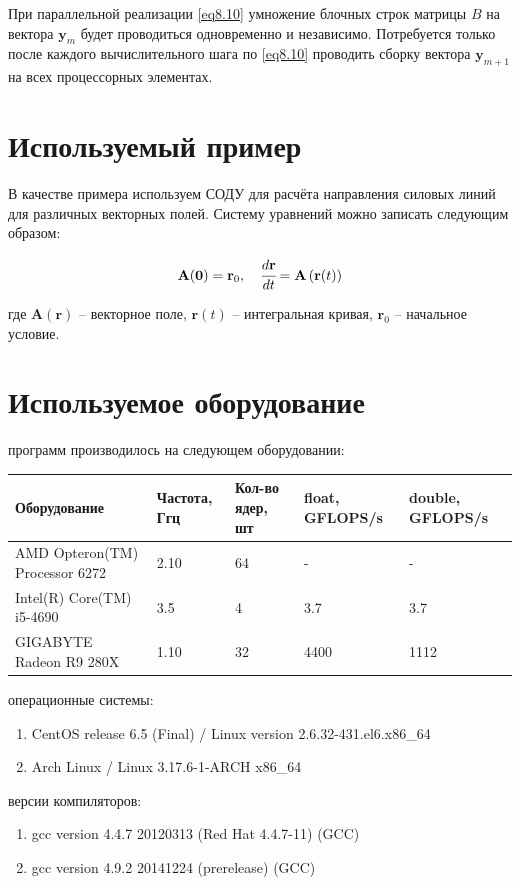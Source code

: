 \documentclass[14pt,final,titlepage,pscyr]{hedwork}
\renewcommand{\vec}[1]{\mathbf{#1}}
\begin{document}
При параллельной реализации \eqref{eq8.10} умножение блочных строк матрицы \( B \) на вектора 
\( \vec{y}_m \) будет проводиться одновременно и независимо. Потребуется только после каждого 
вычислительного шага по \eqref{eq8.10} проводить сборку вектора \( \vec{y}_{m+1} \) на всех процессорных 
элементах.\cite{methods}

\section{Используемый пример}
В качестве примера используем СОДУ для расчёта направления силовых линий для различных векторных 
полей. Систему уравнений можно записать следующим образом:

\[
	\vec{A}(\vec{0}) = \vec{r}_0, \quad \cfrac{d\vec{r}}{dt} = \vec{A}\left( \vec{r}(t) \right)
\]

где \( \vec{A}(\vec{r}) \) -- векторное поле, \( \vec{r}(t) \) -- интегральная кривая, 
\( \vec{r}_0 \) -- начальное условие.

\newpage

\section{Используемое оборудование}
 программ производилось на следующем оборудовании:
\begin{table}[h]
    \center
    \begin{tabular}{|C{5cm}|C{2cm}|C{2cm}|C{3cm}|C{3cm}|}
        \hline
        Оборудование & Частота, Ггц & Кол-во ядер, шт & float, GFLOPS/s & double, GFLOPS/s \\ \hline
        AMD Opteron(TM) Processor 6272 & 2.10 & 64 & - & - \\ \hline
        Intel(R) Core(TM) i5-4690 & 3.5 & 4 & 3.7 & 3.7 \\ \hline
        GIGABYTE Radeon R9 280X & 1.10 & 32 & 4400 & 1112 \\ \hline
    \end{tabular}
\end{table}

 операционные системы:
\begin{enumerate}
	\item CentOS release 6.5 (Final) / Linux version 2.6.32-431.el6.x86\_64
	\item Arch Linux / Linux 3.17.6-1-ARCH x86\_64
\end{enumerate}

 версии компиляторов:
\begin{enumerate}
	\item gcc version 4.4.7 20120313 (Red Hat 4.4.7-11) (GCC)
	\item gcc version 4.9.2 20141224 (prerelease) (GCC) 
\end{enumerate}
\end{document}
